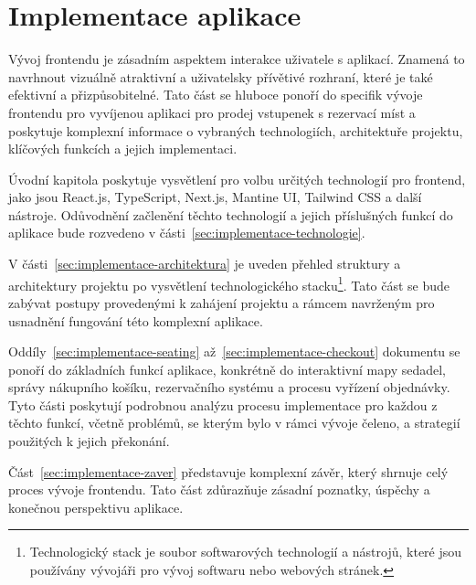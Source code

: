 \chapter{Implementace aplikace}
\label{ch:implementace}
Vývoj frontendu je zásadním aspektem interakce uživatele s aplikací.
Znamená to navrhnout vizuálně atraktivní a uživatelsky přívětivé rozhraní, které je také efektivní a přizpůsobitelné.
Tato část se hluboce ponoří do specifik vývoje frontendu pro vyvíjenou aplikaci pro prodej vstupenek s rezervací míst a poskytuje komplexní informace o vybraných technologiích, architektuře projektu, klíčových funkcích a jejich implementaci.

Úvodní kapitola poskytuje vysvětlení pro volbu určitých technologií pro frontend, jako jsou React.js, TypeScript, Next.js, Mantine UI, Tailwind CSS a další nástroje.
Odůvodnění začlenění těchto technologií a jejich příslušných funkcí do aplikace bude rozvedeno v části~\ref{sec:implementace-technologie}.

V části~\ref{sec:implementace-architektura} je uveden přehled struktury a architektury projektu po vysvětlení technologického stacku\footnote{Technologický stack je soubor softwarových technologií a nástrojů, které jsou používány vývojáři pro vývoj softwaru nebo webových stránek.}.
Tato část se bude zabývat postupy provedenými k zahájení projektu a rámcem navrženým pro usnadnění fungování této komplexní aplikace.

Oddíly~\ref{sec:implementace-seating} až~\ref{sec:implementace-checkout} dokumentu se ponoří do základních funkcí aplikace, konkrétně do interaktivní mapy sedadel, správy nákupního košíku, rezervačního systému a procesu vyřízení objednávky.
Tyto části poskytují podrobnou analýzu procesu implementace pro každou z těchto funkcí, včetně problémů, se kterým bylo v rámci vývoje čeleno, a strategií použitých k jejich překonání.

Část~\ref{sec:implementace-zaver} představuje komplexní závěr, který shrnuje celý proces vývoje frontendu.
Tato část zdůrazňuje zásadní poznatky, úspěchy a konečnou perspektivu aplikace.
